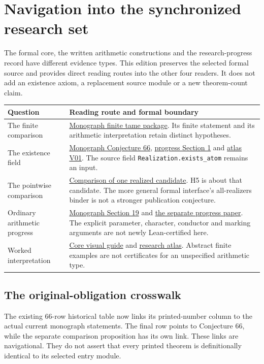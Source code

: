 \clearpage
\section*{Navigation into the synchronized research set}
{}
The formal core, the written arithmetic constructions and the research-progress record have different evidence types. This edition preserves the selected formal source and provides direct reading routes into the other four readers. It does not add an existence axiom, a replacement source module or a new theorem-count claim.

\begin{tabular}{@{}>{\raggedright\arraybackslash}p{.29\linewidth}>{\raggedright\arraybackslash}p{.66\linewidth}@{}}\toprule
Question & Reading route and formal boundary\\\midrule
The finite comparison & \href{https://komorebi.invalid/b06/lean_finite}{Monograph finite tame package}. Its finite statement and its arithmetic interpretation retain distinct hypotheses.\\[9pt]
The existence field & \href{https://komorebi.invalid/b06/lean_contract}{Monograph Conjecture 66}, \href{https://komorebi.invalid/b06/lean_research_contract}{progress Section 1} and \href{https://komorebi.invalid/b06/lean_v01}{atlas V01}. The source field \texttt{Realization.exists\_atom} remains an input.\\[9pt]
The pointwise comparison & \href{https://komorebi.invalid/b06/lean_comparison}{Comparison of one realized candidate}. H5 is about that candidate. The more general formal interface's all-realizers binder is not a stronger publication conjecture.\\[9pt]
Ordinary arithmetic progress & \href{https://komorebi.invalid/b06/lean_arithmetic}{Monograph Section 19} and \href{https://komorebi.invalid/b06/lean_progress}{the separate progress paper}. The explicit parameter, character, conductor and marking arguments are not newly Lean-certified here.\\[9pt]
Worked interpretation & \href{https://komorebi.invalid/b06/lean_core_visual}{Core visual guide} and \href{https://komorebi.invalid/b06/lean_atlas}{research atlas}. Abstract finite examples are not certificates for an unspecified arithmetic type.\\\bottomrule
\end{tabular}

\subsection*{The original-obligation crosswalk}
The existing 66-row historical table now links its printed-number column to the actual current monograph statements. The final row points to Conjecture 66, while the separate comparison proposition has its own link. These links are navigational. They do not assert that every printed theorem is definitionally identical to its selected entry module.

